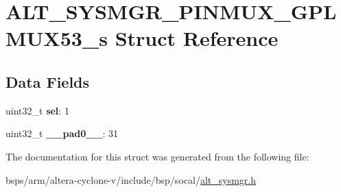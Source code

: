 \hypertarget{structALT__SYSMGR__PINMUX__GPLMUX53__s}{}\section{A\+L\+T\+\_\+\+S\+Y\+S\+M\+G\+R\+\_\+\+P\+I\+N\+M\+U\+X\+\_\+\+G\+P\+L\+M\+U\+X53\+\_\+s Struct Reference}
\label{structALT__SYSMGR__PINMUX__GPLMUX53__s}
\subsection*{Data Fields}
\begin{DoxyCompactItemize}
\item 
\mbox{\label{structALT__SYSMGR__PINMUX__GPLMUX53__s_aa017b60acad4f64a31408b0334331604}} 
uint32\+\_\+t {\bfseries sel}\+: 1
\item 
\mbox{\label{structALT__SYSMGR__PINMUX__GPLMUX53__s_a85e4a4b78692ab4096105d23f16c9ded}} 
uint32\+\_\+t {\bfseries \+\_\+\+\_\+pad0\+\_\+\+\_\+}\+: 31
\end{DoxyCompactItemize}


The documentation for this struct was generated from the following file\+:\begin{DoxyCompactItemize}
\item 
bsps/arm/altera-\/cyclone-\/v/include/bsp/socal/\mbox{\hyperlink{alt__sysmgr_8h}{alt\+\_\+sysmgr.\+h}}\end{DoxyCompactItemize}
